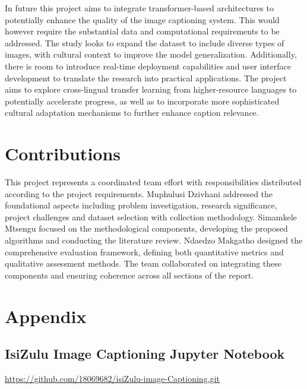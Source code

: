 \documentclass{article}
\begin{document}
In future this project aims to integrate transformer-based architectures to potentially enhance the quality of the image captioning system. This would however require the substantial data and computational requirements to be addressed. The study looks to expand the dataset to include diverse types of images, with cultural context to improve  the model generalization. Additionally, there is room to introduce real-time deployment capabilities and user interface development to translate the research into practical applications. The project aims to explore cross-lingual transfer learning from higher-resource languages to potentially accelerate progress, as well as to incorporate more sophisticated cultural adaptation mechanisms to further enhance caption relevance.

\section{Contributions}
This project represents a coordinated team effort with responsibilities distributed according to the
project requirements. Muphulusi Dzivhani addressed the foundational aspects including problem
investigation, research significance, project challenges and dataset selection with collection methodology.
Simamkele Mtsengu focused on the methodological components, developing the proposed
algorithms and conducting the literature review. Ndaedzo Makgatho designed the comprehensive
evaluation framework, defining both quantitative metrics and qualitative assessment methods. The
team collaborated on integrating these components and ensuring coherence across all sections of the
report.


\appendix
\section{Appendix}
\subsection{IsiZulu Image Captioning Jupyter Notebook}
\url{https://github.com/18069682/isiZulu-image-Captioning.git}



\end{document}
